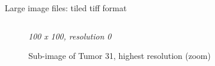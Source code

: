 \documentclass{beamer}
\begin{document}
\begin{frame}{Large image files: tiled tiff format}
\begin{columns}[T]
\begin{column}{.3\textwidth}
\begin{figure}[!ht]
\caption{Sub-image of Tumor 31, highest resolution (zoom)}
\textit{100 x 100, resolution 0}
\label{}
\end{figure}
\end{column}%
\end{columns}


\end{frame}
\end{document}
